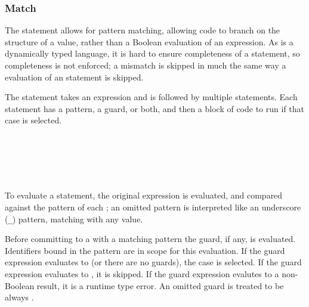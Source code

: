 \subsubsection{Match}
\label{sec:prose-match}

The  statement allows for pattern matching, allowing code to branch
on the structure of a value, rather than a Boolean evaluation of an expression.
As \Trilogy{} is a dynamically typed language, it is hard to ensure completeness
of a  statement, so completeness is not enforced; a mismatch is skipped
in much the same way a  evaluation of an  statement is skipped.

The  statement takes an expression and is followed by multiple 
statements. Each  statement has a pattern, a guard, or both, and then a block
of code to run if that case is selected.

\begin{bnf*}
     \\
     \\
     \\
     \\
\end{bnf*}

To evaluate a  statement, the original expression is evaluated, and compared
against the pattern of each ; an omitted pattern is interpreted like an underscore
(\texttt{\_}) pattern, matching with any value.

Before committing to a  with a matching pattern the guard, if any, is evaluated.
Identifiers bound in the pattern are in scope for this evaluation. If the guard expression
evaluates to  (or there are no guards), the case is selected. If the guard expression
evaluates to , it is skipped. If the guard expression evalutes to a non-Boolean result,
it is a runtime type error. An omitted guard is treated to be always .

